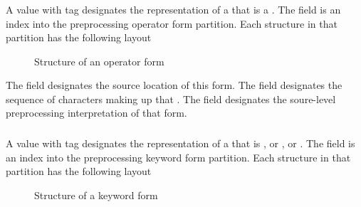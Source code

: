 
\subsubsection{}
\label{sec:ifc:FormSort:Operator}

A  value with tag  designates
the representation of a  that 
is a .
The  field is an index into
the preprocessing operator form partition.  Each structure in that partition
has the following layout
%
\begin{figure}[H]
  \centering
  \caption{Structure of an operator form}
  \label{fig:ifc-operator-form}
\end{figure}

The field  designates the source location of this form.  The
field  designates the sequence of characters making up that 
.  The field  designates the
soure-level preprocessing interpretation of that form. 


\subsubsection{}
\label{sec:ifc:FormSort:Keyword}

A  value with tag  designates
the representation of a  that 
is , or , 
or .
The  field is an index into
the preprocessing keyword form partition.  Each structure in that partition
has the following layout
%
\begin{figure}[H]
  \centering
  \caption{Structure of a keyword form}
  \label{fig:ifc-keyword-form}
\end{figure}

